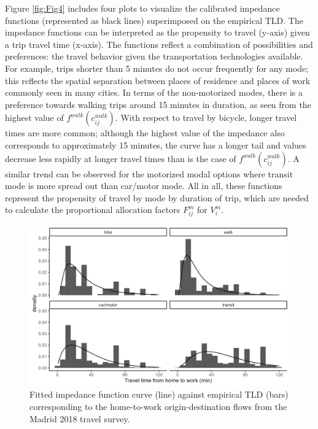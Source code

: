 \documentclass[10pt,letterpaper]{article}
\begin{document}
Figure \ref{fig:Fig4} includes four plots to visualize the calibrated
impedance functions (represented as black lines) superimposed on the
empirical TLD. The impedance functions can be interpreted as the
propensity to travel (y-axis) given a trip travel time (x-axis). The
functions reflect a combination of possibilities and preferences: the
travel behavior given the transportation technologies available. For
example, trips shorter than 5 minutes do not occur frequently for any
mode; this reflects the spatial separation between places of residence
and places of work commonly seen in many cities. In terms of the
non-motorized modes, there is a preference towards walking trips around
15 minutes in duration, as seen from the highest value of
\(f^{walk}(c_{ij}^{walk})\). With respect to travel by bicycle, longer
travel times are more common; although the highest value of the
impedance also corresponds to approximately 15 minutes, the curve has a
longer tail and values decrease less rapidly at longer travel times than
is the case of \(f^{walk}(c_{ij}^{walk})\). A similar trend can be
observed for the motorized modal options where transit mode is more
spread out than car/motor mode. All in all, these functions represent
the propensity of travel by mode by duration of trip, which are needed
to calculate the proportional allocation factors \(F_{ij}^m\) for
\(V_i^m\).

\begin{figure}

{\centering \includegraphics[width=1\linewidth]{images/tlds_curves_m_plot} 

}

\caption{\label{fig:Fig4} Fitted impedance function curve (line) against empirical TLD (bars) corresponding to the home-to-work origin-destination flows from the Madrid 2018 travel survey.}\label{fig:tlds-curves-m-plot}
\end{figure}
\end{document}
